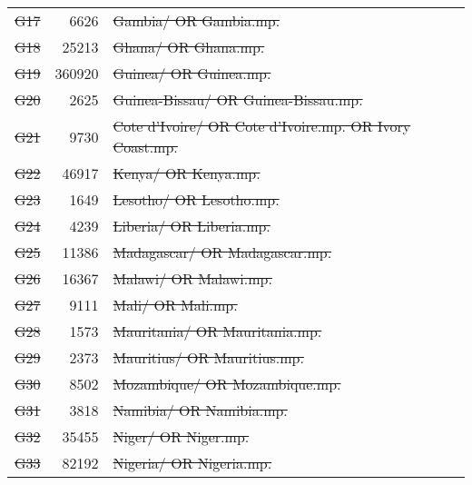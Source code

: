 \begin{longtable}{lrl}
  \st{G17} &   \num{6626} & \st{Gambia/ OR Gambia.mp.}                                                                \\
  \st{G18} &  \num{25213} & \st{Ghana/ OR Ghana.mp.}                                                                  \\
  \st{G19} & \num{360920} & \st{Guinea/ OR Guinea.mp.}                                                                \\
  \st{G20} &   \num{2625} & \st{Guinea-Bissau/ OR Guinea-Bissau.mp.}                                                  \\
  \st{G21} &   \num{9730} & \st{Cote d'Ivoire/ OR Cote d'Ivoire.mp. OR Ivory Coast.mp.}                               \\
  \st{G22} &  \num{46917} & \st{Kenya/ OR Kenya.mp.}                                                                  \\
  \st{G23} &   \num{1649} & \st{Lesotho/ OR Lesotho.mp.}                                                              \\
  \st{G24} &   \num{4239} & \st{Liberia/ OR Liberia.mp.}                                                              \\
  \st{G25} &  \num{11386} & \st{Madagascar/ OR Madagascar.mp.}                                                        \\
  \st{G26} &  \num{16367} & \st{Malawi/ OR Malawi.mp.}                                                                \\
  \st{G27} &   \num{9111} & \st{Mali/ OR Mali.mp.}                                                                    \\
  \st{G28} &   \num{1573} & \st{Mauritania/ OR Mauritania.mp.}                                                        \\
  \st{G29} &   \num{2373} & \st{Mauritius/ OR Mauritius.mp.}                                                          \\
  \st{G30} &   \num{8502} & \st{Mozambique/ OR Mozambique.mp.}                                                        \\
  \st{G31} &   \num{3818} & \st{Namibia/ OR Namibia.mp.}                                                              \\
  \st{G32} &  \num{35455} & \st{Niger/ OR Niger.mp.}                                                                  \\
  \st{G33} &  \num{82192} & \st{Nigeria/ OR Nigeria.mp.}                                                              \\

\end{longtable}
